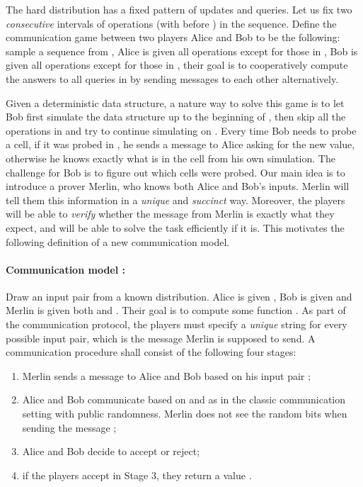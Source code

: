 \documentclass[11pt]{article}
\begin{document}
The hard distribution  has a fixed pattern of updates and queries. Let us fix two \emph{consecutive} intervals  of operations (with  before ) in the sequence. Define the communication game  between two players Alice and Bob to be the following: sample a sequence from , Alice is given all operations except for those in , Bob is given all operations except for those in , their goal is to cooperatively compute the answers to all queries in  by sending messages to each other alternatively.

Given a deterministic \bps{} data structure, a nature way to solve this game is to let Bob first simulate the data structure up to the beginning of , then skip all the operations in  and try to continue simulating on . Every time Bob needs to probe a cell, if it was probed in , he sends a message to Alice asking for the new value, otherwise he knows exactly what is in the cell from his own simulation. The challenge for Bob is to figure out which cells were probed. Our main idea is to introduce a prover Merlin, who knows both Alice and Bob's inputs. Merlin will tell them this information in a \emph{unique} and \emph{succinct} way. Moreover, the players will be able to \emph{verify} whether the message from Merlin is exactly what they expect, and will be able to solve the task efficiently if it is. This motivates the following definition of a new communication model.

\paragraph*{Communication model :}

Draw an input pair  from a known distribution. Alice is given , Bob is given  and Merlin is given both  and . Their goal is to compute some function . As part of the communication protocol, the players must specify a \emph{unique} string  for every possible input pair, which is the message Merlin is supposed to send. A communication procedure shall consist of the following four stages:

\begin{enumerate}
	\item
		Merlin sends a message  to Alice and Bob based on his input pair ; 
	\item
		Alice and Bob communicate based on  and  as in the classic communication setting with public randomness. Merlin does not see the random bits when sending the message ;
	\item
		Alice and Bob decide to accept or reject;
	\item
		if the players accept in Stage 3, they return a value .
\end{enumerate}
\end{document}
